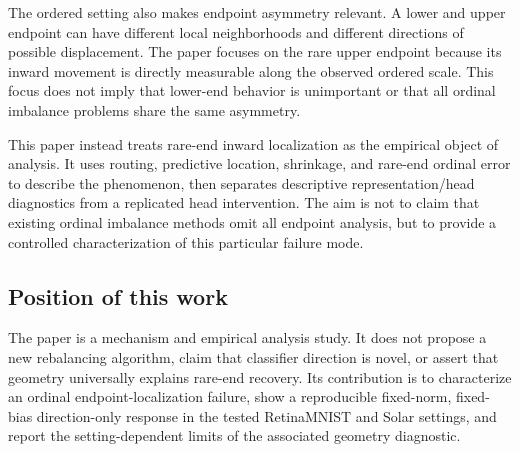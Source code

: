 The ordered setting also makes endpoint asymmetry relevant. A lower and upper
endpoint can have different local neighborhoods and different directions of
possible displacement. The paper focuses on the rare upper endpoint because its
inward movement is directly measurable along the observed ordered scale. This
focus does not imply that lower-end behavior is unimportant or that all ordinal
imbalance problems share the same asymmetry.

This paper instead treats rare-end inward localization as the empirical object
of analysis. It uses routing, predictive location, shrinkage, and rare-end
ordinal error to describe the phenomenon, then separates descriptive
representation/head diagnostics from a replicated head intervention. The aim
is not to claim that existing ordinal imbalance methods omit all endpoint
analysis, but to provide a controlled characterization of this particular
failure mode.

\subsection{Position of this work}

The paper is a mechanism and empirical analysis study. It does not propose a
new rebalancing algorithm, claim that classifier direction is novel, or assert
that geometry universally explains rare-end recovery. Its contribution is to
characterize an ordinal endpoint-localization failure, show a reproducible
fixed-norm, fixed-bias direction-only response in the tested RetinaMNIST and
Solar settings, and report the setting-dependent limits of the associated
geometry diagnostic.

